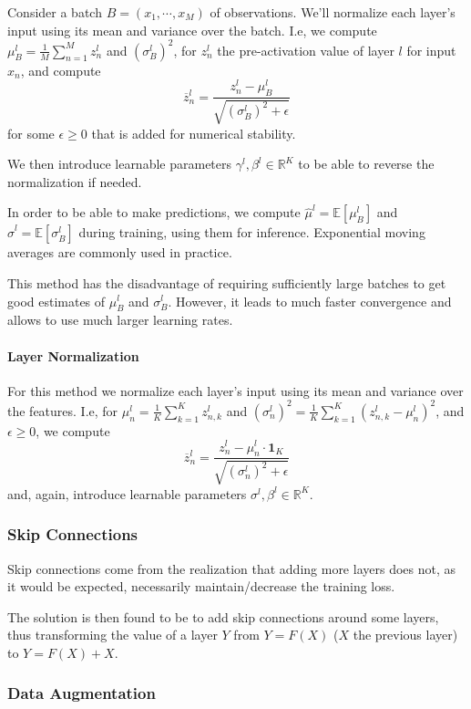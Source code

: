 \documentclass{article}
\newcommand{\R}{\mathbb{R}}
\newcommand{\E}{\mathbb{E}}
\begin{document}
Consider a batch $B = (x_1, \cdots, x_M)$ of observations.
We'll normalize each layer's input using its mean and variance over the batch.
I.e, we compute $\mu_B^l = \frac{1}{M} \sum_{n=1}^M z_n^l$ and $(\sigma_B^l)^2$, for $z_n^l$ the pre-activation value of layer $l$ for input $x_n$, and compute
$$
\overline{z}_n^l = \frac{z_n^l - \mu_B^l}{\sqrt{(\sigma_B^l)^2 + \epsilon}}
$$
for some $\epsilon \geq 0$ that is added for numerical stability.

We then introduce learnable parameters $\gamma^l, \beta^l \in \R^K$ to be able to reverse the normalization if needed.

In order to be able to make predictions, we compute $\hat\mu^l = \E [ \mu_B^l]$ and $\hat\sigma^l = \E[\sigma_B^l]$ during training, using them for inference.
Exponential moving averages are commonly used in practice.

This method has the disadvantage of requiring sufficiently large batches to get good estimates of $\mu_B^l$ and $\sigma_B^l$.
However, it leads to much faster convergence and allows to use much larger learning rates.

\paragraph{Layer Normalization}

For this method we normalize each layer's input using its mean and variance over the features.
I.e, for $\mu_n^l = \frac{1}{K} \sum_{k=1}^K z_{n,k}^l$ and $(\sigma_n^l)^2 = \frac{1}{K} \sum_{k=1}^K (z_{n,k}^l - \mu_n^l)^2$, and $\epsilon \geq 0$, we compute
$$
\overline{z}_n^l = \frac{z_n^l - \mu_n^l \cdot \mathbf{1}_K}{\sqrt{(\sigma_n^l)^2 + \epsilon}}
$$
and, again, introduce learnable parameters $\sigma^l, \beta^l \in \R^K$.

\subsubsection{Skip Connections}

Skip connections come from the realization that adding more layers does not, as it would be expected, necessarily maintain/decrease the training loss.

The solution is then found to be to add skip connections around some layers, thus transforming the value of a layer $Y$ from $Y = F(X)$ ($X$ the previous layer) to $Y = F(X) + X$.

\subsubsection{Data Augmentation}
\end{document}
